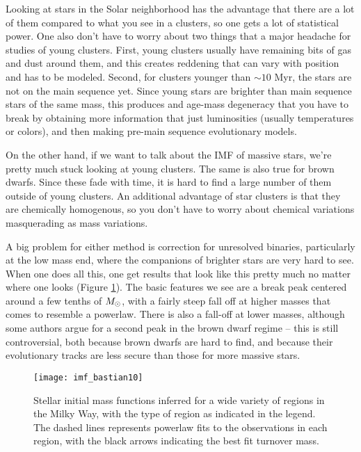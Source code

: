 Looking at stars in the Solar neighborhood has the advantage that there are a lot of them compared to what you see in a clusters, so one gets a lot of statistical power. One also don't have to worry about two things that a major headache for studies of young clusters. First, young clusters usually have remaining bits of gas and dust around them, and this creates reddening that can vary with position and has to be modeled. Second, for clusters younger than $\sim 10$ Myr, the stars are not on the main sequence yet. Since young stars are brighter than main sequence stars of the same mass, this produces and age-mass degeneracy that you have to break by obtaining more information that just luminosities (usually temperatures or colors), and then making pre-main sequence evolutionary models. 

On the other hand, if we want to talk about the IMF of massive stars, we're pretty much stuck looking at young clusters. The same is also true for brown dwarfs. Since these fade with time, it is hard to find a large number of them outside of young clusters. An additional advantage of star clusters is that they are chemically homogenous, so you don't have to worry about chemical variations masquerading as mass variations.

A big problem for either method is correction for unresolved binaries, particularly at the low mass end, where the companions of brighter stars are very hard to see. When one does all this, one get results that look like this pretty much no matter where one looks (Figure \ref{fig:imf_bastian10}).  The basic features we see are a break peak centered around a few tenths of $M_{\odot}$, with a fairly steep fall off at higher masses that comes to resemble a powerlaw. There is also a fall-off at lower masses, although some authors argue for a second peak in the brown dwarf regime -- this is still controversial, both because brown dwarfs are hard to find, and because their evolutionary tracks are less secure than those for more massive stars.

\begin{figure}
\texttt{[image: imf\_bastian10]}
\caption[Measured stellar IMFs in a variety of regions]{
\label{fig:imf_bastian10}
Stellar initial mass functions inferred for a wide variety of regions in the Milky Way, with the type of region as indicated in the legend. The dashed lines represents powerlaw fits to the observations in each region, with the black arrows indicating the best fit turnover mass.
}
\end{figure}

